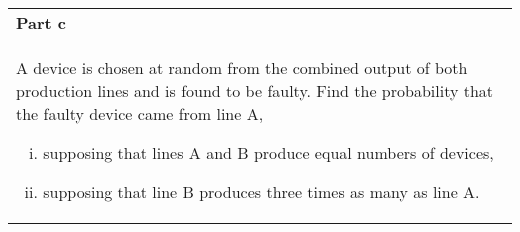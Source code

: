 \documentclass[a4paper,12pt]{article}
\begin{document}
\newpage
  \begin{table}[ht!]
     \centering
     \begin{tabular}{|p{15cm}|}
     \hline
     \large
     \smallskip
\noindent \textbf{Part c} \\
\large
A device is chosen at random from the combined output of both production lines and is found to be faulty.  Find the probability that the faulty device came from line A, 
 
\begin{enumerate}[(i)]
\item supposing that lines A and B produce equal numbers of devices, 
\item supposing that line B produces three times as many as line A. 
\end{enumerate}
\\ \hline 
      \end{tabular}
    \end{table} 
    


\end{document}
